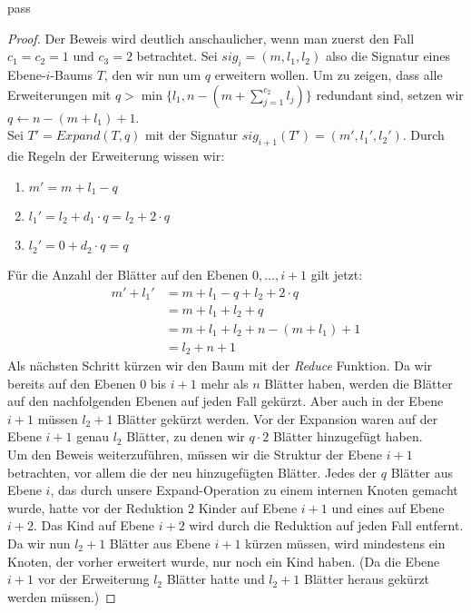 pass\documentclass[a4paper,10pt,ngerman]{scrartcl}
\begin{document}
    \begin{proof}
        Der Beweis wird deutlich anschaulicher, wenn man zuerst den Fall $c_1 = c_2 = 1$ und $c_3 = 2$ betrachtet.
        Sei $sig_i = (m, l_1, l_2)$ also die Signatur eines Ebene-$i$-Baums $T$, den wir nun um $q$ erweitern wollen.
        Um zu zeigen, dass alle Erweiterungen mit $q > \min\{l_1, n - (m + \sum^{c_2}_{j=1} l_j)\}$ redundant sind, setzen wir $q \gets n - (m + l_1) + 1$. \\
        Sei $T' = Expand(T, q)$ mit der Signatur $sig_{i+1}(T') = (m', l_1', l_2')$.
        Durch die Regeln der Erweiterung wissen wir:
        \begin{enumerate}
            \item $m' = m + l_1 - q$
            \item $l_1' = l_2 + d_1 \cdot q = l_2 + 2 \cdot q$
            \item $l_2' = 0 + d_2 \cdot q = q$
        \end{enumerate}
        Für die Anzahl der Blätter auf den Ebenen $0, \dots, i + 1$ gilt jetzt:
        \begin{equation}
            \begin{aligned}
                m'+ l_1' &= m + l_1 - q + l_2 + 2 \cdot q\\
                &= m + l_1 + l_2 + q\\
                &= m + l_1 + l_2 + n - (m + l_1) + 1\\
                &= l_2 + n + 1
            \end{aligned}\label{eq:equation}
        \end{equation}
        Als nächsten Schritt kürzen wir den Baum mit der \textit{Reduce} Funktion.
        Da wir bereits auf den Ebenen $0$ bis $i+1$ mehr als $n$ Blätter haben, werden die Blätter auf den nachfolgenden Ebenen auf jeden Fall gekürzt.
        Aber auch in der Ebene $i + 1$ müssen $l_2 + 1$ Blätter gekürzt werden.
        Vor der Expansion waren auf der Ebene $i + 1$ genau $l_2$ Blätter, zu denen wir $q \cdot 2$ Blätter hinzugefügt haben. \\
        Um den Beweis weiterzuführen, müssen wir die Struktur der Ebene $i+1$ betrachten, vor allem die der neu hinzugefügten Blätter.
        Jedes der $q$ Blätter aus Ebene $i$, das durch unsere Expand-Operation zu einem internen Knoten gemacht wurde, hatte vor der Reduktion $2$ Kinder auf Ebene $i + 1$ und eines auf Ebene $i + 2$.
        Das Kind auf Ebene $i + 2$ wird durch die Reduktion auf jeden Fall entfernt.
        Da wir nun $l_2 + 1$ Blätter aus Ebene $i + 1$ kürzen müssen, wird mindestens ein Knoten, der vorher erweitert wurde, nur noch ein Kind haben. (Da die Ebene $i + 1$ vor der Erweiterung $l_2$ Blätter hatte und $l_2 + 1$ Blätter heraus gekürzt werden müssen.)

\end{proof}
\end{document}
